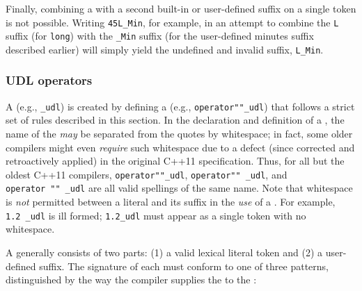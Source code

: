 \noindent Finally, combining a  with a
second built-in or user-defined suffix on a single token is not possible. Writing
\lstinline!45L_Min!, for example, in an attempt to combine the \lstinline!L!
suffix (for \lstinline!long!) with the \lstinline!_Min! suffix (for the
user-defined minutes suffix described earlier) will
simply yield the undefined and invalid suffix, \lstinline!L_Min!.

\subsubsection[UDL operators]{UDL operators}\label{user-defined-literal-(udl)-operators}

A  (e.g., \lstinline!_udl!) is created by defining a
 (e.g., \lstinline!operator""_udl!) that follows a
strict set of rules described in this section. In the declaration and
definition of a , the name of the  \emph{may} be separated from the quotes by whitespace; in fact,
some older compilers might even \emph{require} such whitespace due to a
defect (since corrected and retroactively applied)  in the original C++11 specification. Thus, for all but the oldest C++11 compilers,
\lstinline!operator""_udl!, \lstinline!operator""!~\lstinline!_udl!, and
\lstinline!operator!~\lstinline!""!~\lstinline!_udl! are all valid spellings of
the same  name. Note that whitespace is \emph{not}
permitted between a literal and its suffix in the \emph{use} of a
. For example, \lstinline!1.2!~\lstinline!_udl! is ill formed;
\lstinline!1.2_udl! must appear as a single token with no whitespace.

A  generally consists of two parts: (1) a valid lexical
literal token and (2) a user-defined suffix. The signature of each
 must conform to one of three patterns,
distinguished by the way the compiler supplies the  to the :

